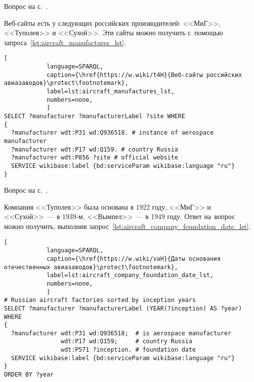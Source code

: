 \hfil{}\hfil%



\newpage
\begin{task}
    \label{answer:aircraft_manufacturers}
    \AnswerBackref Вопрос на с.~\pageref{lst:lang2}.

    Веб-сайты есть у следующих российских производителей: 
    <<МиГ>>, <<Туполев>> и <<Сухой>>. 
    Эти сайты можно получить с~помощью запроса~\ref{lst:aircraft_manufactures_lst}. 

\begin{lstlisting}[ 
            language=SPARQL, 
            caption={\href{https://w.wiki/t4H}{Веб-сайты российских авиазаводов}\protect\footnotemark}, 
            label=lst:aircraft_manufactures_lst, 
            numbers=none,
            ]
SELECT ?manufacturer ?manufacturerLabel ?site WHERE
{
  ?manufacturer wdt:P31 wd:Q936518. # instance of aerospace manufacturer
  ?manufacturer wdt:P17 wd:Q159. # country Russia
  ?manufacturer wdt:P856 ?site # official website
  SERVICE wikibase:label {bd:serviceParam wikibase:language "ru"}
}
\end{lstlisting}
\end{task}


\begin{task}
    \label{answer:aircraft_company_foundation_date}
    \AnswerBackref Вопрос на с.~\pageref{aircraft_question_2}.
    
    Компания 
<<Туполев>> была основана в 1922 году, 
<<МиГ>> и <<Сухой>>~--- в 1939-м, 
<<Вымпел>>~--- в 1949 году.
    Ответ на~вопрос можно получить, выполнив запрос~\ref{lst:aircraft_company_foundation_date_lst}. 
    
	\begin{lstlisting}[ 
            language=SPARQL, 
            caption={\href{https://w.wiki/vaH}{Даты основания отечественных авиазаводов}\protect\footnotemark}, 
            label=lst:aircraft_company_foundation_date_lst, 
            numbers=none,
            ]
# Russian aircraft factories sorted by inception years
SELECT ?manufacturer ?manufacturerLabel (YEAR(?inception) AS ?year) WHERE 
{
  ?manufacturer wdt:P31 wd:Q936518;  # is aerospace manufacturer
                wdt:P17 wd:Q159;     # country Russia
                wdt:P571 ?inception. # foundation date
  SERVICE wikibase:label {bd:serviceParam wikibase:language "ru"}
}
ORDER BY ?year
\end{lstlisting}
\end{task}


